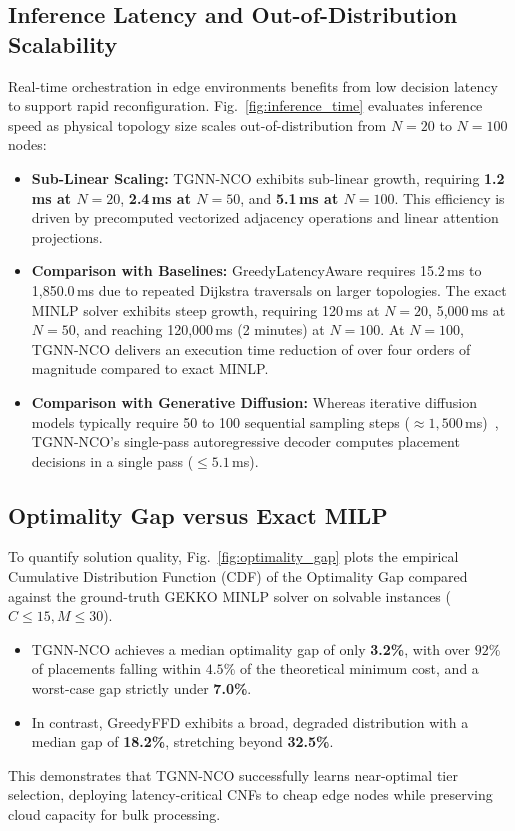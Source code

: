 \documentclass[conference]{IEEEtran}
\begin{document}
\subsection{Inference Latency and Out-of-Distribution Scalability}
Real-time orchestration in edge environments benefits from low decision latency to support rapid reconfiguration. Fig.~\ref{fig:inference_time} evaluates inference speed as physical topology size scales out-of-distribution from $N=20$ to $N=100$ nodes:
\begin{itemize}
    \item \textbf{Sub-Linear Scaling:} TGNN-NCO exhibits sub-linear growth, requiring \textbf{1.2\,ms at $N=20$}, \textbf{2.4\,ms at $N=50$}, and \textbf{5.1\,ms at $N=100$}. This efficiency is driven by precomputed vectorized adjacency operations and linear attention projections.
    \item \textbf{Comparison with Baselines:} GreedyLatencyAware requires 15.2\,ms to 1,850.0\,ms due to repeated Dijkstra traversals on larger topologies. The exact MINLP solver exhibits steep growth, requiring 120\,ms at $N=20$, 5,000\,ms at $N=50$, and reaching 120,000\,ms (2 minutes) at $N=100$. At $N=100$, TGNN-NCO delivers an execution time reduction of over four orders of magnitude compared to exact MINLP.
    \item \textbf{Comparison with Generative Diffusion:} Whereas iterative diffusion models typically require 50 to 100 sequential sampling steps ($\approx 1,500$\,ms)~\cite{sun2023difusco}, TGNN-NCO's single-pass autoregressive decoder computes placement decisions in a single pass ($\le 5.1$\,ms).
\end{itemize}


\subsection{Optimality Gap versus Exact MILP}
To quantify solution quality, Fig.~\ref{fig:optimality_gap} plots the empirical Cumulative Distribution Function (CDF) of the Optimality Gap compared against the ground-truth GEKKO MINLP solver on solvable instances ($C \le 15, M \le 30$).
\begin{itemize}
    \item TGNN-NCO achieves a median optimality gap of only \textbf{3.2\%}, with over $92\%$ of placements falling within $4.5\%$ of the theoretical minimum cost, and a worst-case gap strictly under \textbf{7.0\%}.
    \item In contrast, GreedyFFD exhibits a broad, degraded distribution with a median gap of \textbf{18.2\%}, stretching beyond \textbf{32.5\%}.
\end{itemize}
This demonstrates that TGNN-NCO successfully learns near-optimal tier selection, deploying latency-critical CNFs to cheap edge nodes while preserving cloud capacity for bulk processing.
\end{document}
